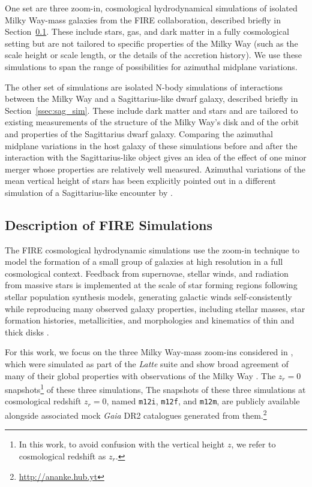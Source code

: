 \documentclass[twocolumn]{aastex62}
\newcommand{\mi}{\texttt{m12i}}
\newcommand{\mf}{\texttt{m12f}}
\newcommand{\mm}{\texttt{m12m}}
\newcommand{\z}{z_r}
\begin{document}
One set are three zoom-in, cosmological hydrodynamical simulations of isolated
Milky Way-mass galaxies from the FIRE collaboration, described briefly in
Section~\ref{ssec:cosmozoom}. These include stars, gas, and dark matter in a
fully cosmological setting but are not tailored to specific properties of the
Milky Way (such as the scale height or scale length, or the details of the
accretion history). We use these simulations to span the range of
possibilities for azimuthal midplane variations.

The other set of simulations are isolated N-body simulations of interactions
between the Milky Way and a Sagittarius-like dwarf galaxy, described briefly
in Section~\ref{ssec:sag_sim}. These include dark matter and stars and are
tailored to existing measurements of the structure of the Milky Way's disk and
of the orbit and properties of the Sagittarius dwarf galaxy. Comparing the
azimuthal midplane variations in the host galaxy of these simulations before
and after the interaction with the Sagittarius-like object gives an idea of
the effect of one minor merger whose properties are relatively well measured.
Azimuthal variations of the mean vertical height of stars has been explicitly
pointed out in a different simulation of a Sagittarius-like encounter by
\citet{2013MNRAS.429..159G}.

\subsection{Description of FIRE Simulations} \label{ssec:cosmozoom}
The FIRE cosmological hydrodynamic simulations
\citep{2014MNRAS.445..581H,2018MNRAS.480..800H} use the zoom-in technique
\citep[e.g.,][]{1993ApJ...412..455K,2014MNRAS.437.1894O} to model the
formation of a small group of galaxies at high resolution in a full
cosmological context. Feedback from supernovae, stellar winds, and radiation
from massive stars is implemented at the scale of star forming regions
following stellar population synthesis models, generating galactic winds
self-consistently \citep{2015MNRAS.454.2691M, 2017MNRAS.470.4698A} while
reproducing many observed galaxy properties, including stellar masses, star
formation histories, metallicities, and morphologies and kinematics of thin
and thick disks \citep{2014MNRAS.445..581H, 2016MNRAS.456.2140M,
2017MNRAS.467.2430M, 2016ApJ...827L..23W, 2018MNRAS.481.4133G,
2018MNRAS.480..800H}.

For this work, we focus on the three Milky Way-mass zoom-ins considered in
\citet{2018arXiv180610564S}, which were simulated as part of the
\textit{Latte} suite and show broad agreement of many of their global
properties with observations of the Milky Way \citep{2016ApJ...827L..23W,
2018MNRAS.481.4133G}. The $\z = 0$ snapshots\footnote{In this work, to avoid
confusion with the vertical height $z$, we refer to cosmological redshift as
$\z$.} of these three simulations, The snapshots of these three simulations at
cosmological redshift $\z = 0$, named \mi{}, \mf{}, and \mm{}, are publicly
available alongside associated mock \textit{Gaia} DR2 catalogues generated
from them.\footnote{\url{http://ananke.hub.yt}}
\end{document}
